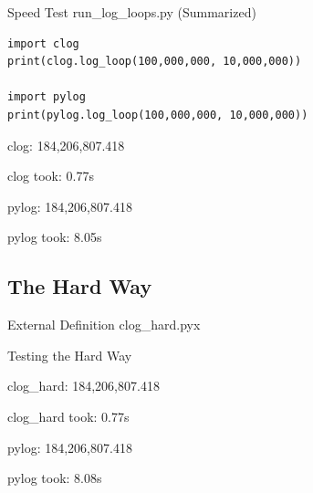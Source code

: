 \documentclass[11pt]{beamer}
\begin{document}
\begin{frame}[fragile]{Speed Test}
	run\_log\_loops.py (Summarized)
	\begin{lstlisting}
import clog
print(clog.log_loop(100,000,000, 10,000,000))

import pylog
print(pylog.log_loop(100,000,000, 10,000,000))
	\end{lstlisting}
	
	\vspace{1cm}
	
	\pause
	\begin{minipage}{0.45\linewidth}
		clog: 184,206,807.418

		clog took: 0.77s
	\end{minipage}
	\begin{minipage}{0.45\linewidth}
		pylog: 184,206,807.418
	
		pylog took: 8.05s
	\end{minipage}
	
	\vspace{1cm}

\end{frame}

\subsection{The Hard Way}
\begin{frame}[fragile]{External Definition}
	clog\_hard.pyx
	
\end{frame}

\begin{frame}[fragile]{Testing the Hard Way}
	\begin{minipage}{0.45\linewidth}
		clog\_hard: 184,206,807.418

		clog\_hard took: 0.77s
	\end{minipage}
	\begin{minipage}{0.45\linewidth}
		pylog: 184,206,807.418
	
		pylog took: 8.08s
	\end{minipage}
\end{frame}
\end{document}
